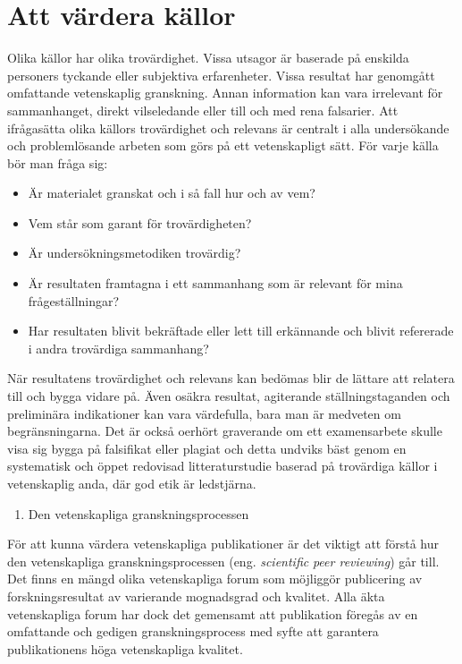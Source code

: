 \section{Att värdera källor}\label{att-vuxe4rdera-kuxe4llor}

Olika källor har olika trovärdighet. Vissa utsagor är baserade på
enskilda personers tyckande eller subjektiva erfarenheter. Vissa
resultat har genomgått omfattande vetenskaplig granskning. Annan
information kan vara irrelevant för sammanhanget, direkt vilseledande
eller till och med rena falsarier. Att ifrågasätta olika källors
trovärdighet och relevans är centralt i alla undersökande och
problemlösande arbeten som görs på ett vetenskapligt sätt. För varje
källa bör man fråga sig:

\begin{itemize}
\item
  Är materialet granskat och i så fall hur och av vem?
\item
  Vem står som garant för trovärdigheten?
\item
  Är undersökningsmetodiken trovärdig?
\item
  Är resultaten framtagna i ett sammanhang som är relevant för mina
  frågeställningar?
\item
  Har resultaten blivit bekräftade eller lett till erkännande och blivit
  refererade i andra trovärdiga sammanhang?
\end{itemize}

När resultatens trovärdighet och relevans kan bedömas blir de lättare
att relatera till och bygga vidare på. Även osäkra resultat, agiterande
ställningstaganden och preliminära indikationer kan vara värdefulla,
bara man är medveten om begränsningarna. Det är också oerhört graverande
om ett examensarbete skulle visa sig bygga på falsifikat eller plagiat
och detta undviks bäst genom en systematisk och öppet redovisad
litteraturstudie baserad på trovärdiga källor i vetenskaplig anda, där
god etik är ledstjärna.

\begin{enumerate}
\def\labelenumi{\arabic{enumi}.}
\item
  Den vetenskapliga granskningsprocessen
\end{enumerate}

För att kunna värdera vetenskapliga publikationer är det viktigt att
förstå hur den vetenskapliga granskningsprocessen (eng.
\emph{scientific} \emph{peer reviewing}) går till. Det finns en mängd
olika vetenskapliga forum som möjliggör publicering av
forskningsresultat av varierande mognadsgrad och kvalitet. Alla äkta
vetenskapliga forum har dock det gemensamt att publikation föregås av en
omfattande och gedigen granskningsprocess med syfte att garantera
publikationens höga vetenskapliga kvalitet.

